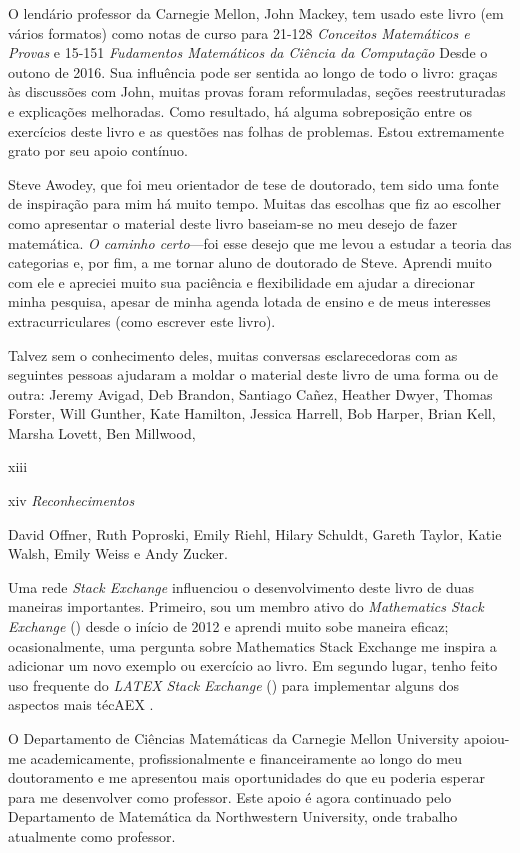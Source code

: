 \documentclass[
]{article}
\begin{document}
O lendário professor da Carnegie Mellon, John Mackey, tem usado este
livro (em vários formatos) como notas de curso para 21-128
\emph{Conceitos Matemáticos e Provas} e 15-151 \emph{Fudamentos
Matemáticos da Ciência da Computação} Desde o outono de 2016. Sua
influência pode ser sentida ao longo de todo o livro: graças às
discussões com John, muitas provas foram reformuladas, seções
reestruturadas e explicações melhoradas. Como resultado, há alguma
sobreposição entre os exercícios deste livro e as questões nas folhas de
problemas. Estou extremamente grato por seu apoio contínuo.

Steve Awodey, que foi meu orientador de tese de doutorado, tem sido uma
fonte de inspiração para mim há muito tempo. Muitas das escolhas que fiz
ao escolher como apresentar o material deste livro baseiam-se no meu
desejo de fazer matemática. \emph{O caminho certo}---foi esse desejo que
me levou a estudar a teoria das categorias e, por fim, a me tornar aluno
de doutorado de Steve. Aprendi muito com ele e apreciei muito sua
paciência e flexibilidade em ajudar a direcionar minha pesquisa, apesar
de minha agenda lotada de ensino e de meus interesses extracurriculares
(como escrever este livro).

Talvez sem o conhecimento deles, muitas conversas esclarecedoras com as
seguintes pessoas ajudaram a moldar o material deste livro de uma forma
ou de outra: Jeremy Avigad, Deb Brandon, Santiago Cañez, Heather Dwyer,
Thomas Forster, Will Gunther, Kate Hamilton, Jessica Harrell, Bob
Harper, Brian Kell, Marsha Lovett, Ben Millwood,

xiii

xiv \emph{Reconhecimentos}

David Offner, Ruth Poproski, Emily Riehl, Hilary Schuldt, Gareth Taylor,
Katie Walsh, Emily Weiss e Andy Zucker.

Uma rede \emph{Stack Exchange} influenciou o desenvolvimento deste livro
de duas maneiras importantes. Primeiro, sou um membro ativo do
\emph{Mathematics Stack Exchange} () desde o início de 2012 e aprendi
muito sobe maneira eficaz; ocasionalmente, uma pergunta sobre
Mathematics Stack Exchange me inspira a adicionar um novo exemplo ou
exercício ao livro. Em segundo lugar, tenho feito uso frequente do
\emph{LATEX Stack Exchange} () para implementar alguns dos aspectos mais
técAEX .

O Departamento de Ciências Matemáticas da Carnegie Mellon University
apoiou-me academicamente, profissionalmente e financeiramente ao longo
do meu doutoramento e me apresentou mais oportunidades do que eu poderia
esperar para me desenvolver como professor. Este apoio é agora
continuado pelo Departamento de Matemática da Northwestern University,
onde trabalho atualmente como professor.
\end{document}
